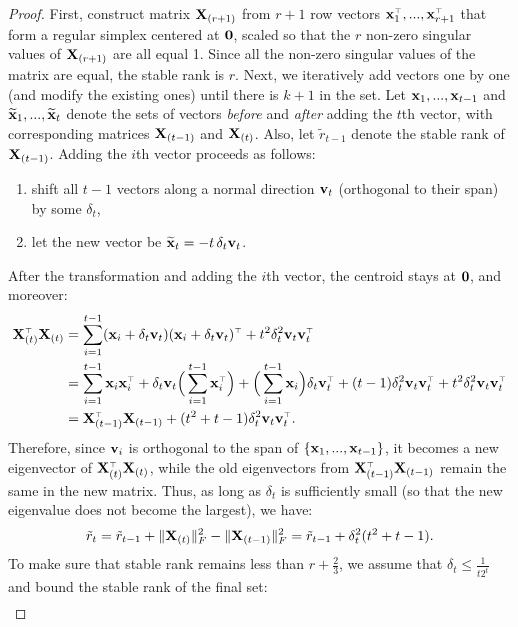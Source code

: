 \documentclass[12pt]{sty/colt2019/colt2018-arxiv}
\begin{document}
\begin{proof}
First, construct matrix $\mathbf X_{(r+1)}$  from $r+1$ row vectors
$\x_1^\top,...,\x_{r+1}^\top$ that form 
  a regular simplex centered at $\mathbf 0$, scaled so that the $r$ non-zero
  singular values of $\mathbf X_{(r+1)}$ are all equal 1. Since all the non-zero
  singular values of the matrix are equal, the stable rank
is $r$. Next, we iteratively add vectors one by one (and modify the
existing ones) until there is $k+1$ in the set. Let $\mathbf x_{1},...,\mathbf x_{t-1}$ and
$\widetilde{\mathbf x}_1,...,\widetilde{\mathbf x}_t$ denote the 
sets of vectors \emph{before} and \emph{after} adding the $t$th vector,
with corresponding matrices $\mathbf X_{(t-1)}$ and $\mathbf X_{(t)}$. Also, let
$\tilde r_{t-1}$ denote the stable rank of $\mathbf X_{(t-1)}$.
Adding the $i$th vector proceeds as follows:
  \begin{enumerate}
    \item shift all $t-1$ vectors along a normal direction $\mathbf v_t$
      (orthogonal to their span) by some $\delta_t$,
    \item let the new vector be $\widetilde{\mathbf x}_{t}=-t\,\delta_t\mathbf v_t$.
    \end{enumerate}
    After the transformation and adding the $i$th vector, the centroid
    stays at $\mathbf 0$, and moreover:
    \begin{align*}
      \X_{(t)}^\top\X_{(t)} &=
      \sum_{i=1}^{t-1}(\x_i+\delta_t\v_t)(\x_i+\delta_t\v_t)^\top +
      t^2\delta_t^2\v_t\v_t^\top\\
      &=\sum_{i=1}^{t-1}\x_i\x_i^\top +
        \delta_t\v_t\Big(\sum_{i=1}^{t-1}\x_i^\top\Big) +
        \Big(\sum_{i=1}^{t-1}\x_i\Big)\delta_t\v_t^\top +
 (t-1)\delta_t^2\v_t\v_t^\top+        t^2\delta_t^2\v_t\v_t^\top\\
      &=\X_{(t-1)}^\top\X_{(t-1)}+(t^2+t-1)\delta_t^2\v_t\v_t^\top.
    \end{align*}
Therefore, since $\mathbf v_i$ is orthogonal to the span of $\{\mathbf x_{1},...,\mathbf x_{t-1}\}$,
it becomes a new eigenvector of $\X_{(t)}^\top\X_{(t)}$, while the old
eigenvectors from $\X_{(t-1)}^\top\X_{(t-1)}$ remain the same in the
new matrix. Thus, as long as $\delta_t$ is sufficiently small (so that
the new eigenvalue does not become the largest), we have:
    \begin{align*}
\tilde r_{t} = \tilde r_{t-1} + \|\mathbf X_{(t)}\|_F^2
      -\|\mathbf X_{(t-1)}\|_F^2=\tilde r_{t-1} + \delta_t^2(t^2+t-1).
    \end{align*}
    To make sure that stable rank remains less than $r+\frac23$, we
    assume that $\delta_t\leq\frac1{t2^{t}}$ and bound the stable rank of the final set:
    \begin{align*}

\end{align*}
\end{proof}
\end{document}
